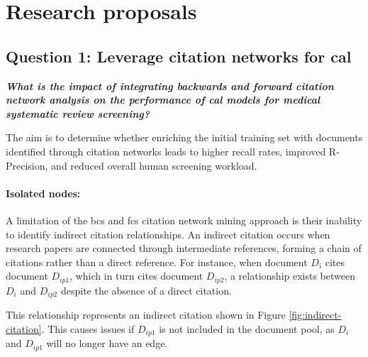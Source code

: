 \documentclass[10pt,oneside]{book}
\begin{document}
\section{Research proposals}\label{sec:research_proposals}

\subsection{Question 1: Leverage citation networks for \gls*{cal}}

\begin{tcolorbox}[colback=skyblue!10, colframe=skyblue, sharp corners=southwest, boxrule=0.8pt]
\emph{\textbf{What is the impact of integrating backwards and forward citation network analysis on the performance of \gls*{cal} models for medical systematic review screening?}}
\end{tcolorbox}

The aim is to determine whether enriching the initial training set with documents identified through citation networks leads to higher recall rates, improved R-Precision, and reduced overall human screening workload. 

\paragraph{Isolated nodes:}
A limitation of the \gls*{bcs} and \gls*{fcs} citation network mining approach is their inability to identify indirect citation relationships. An indirect citation occurs when research papers are connected through intermediate references, forming a chain of citations rather than a direct reference. For instance, when document $D_i$ cites document $D_{ip1}$, which in turn cites document $D_{ip2}$, a relationship exists between $D_i$ and $D_{ip2}$ despite the absence of a direct citation. 



This relationship represents an indirect citation shown in Figure \ref{fig:indirect-citation}. This causes issues if $D_{ip1}$ is not included in the document pool, as $D_i$ and $D_{ip1}$ will no longer have an edge.
\end{document}
